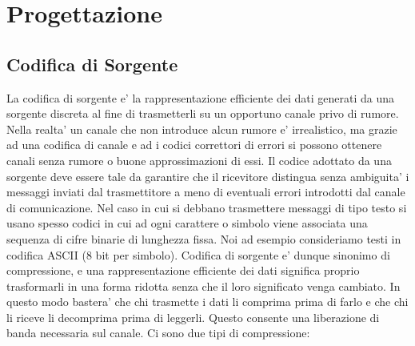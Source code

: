 \documentclass[a4paper,11pt]{article}
\theoremstyle{definition}
\begin{document}
\clearpage

\section{Progettazione}
\subsection{Codifica di Sorgente}
La codifica di sorgente e' la rappresentazione efficiente dei dati generati da una sorgente discreta al fine di trasmetterli su un opportuno canale privo di rumore. Nella realta' un canale che non introduce alcun rumore e' irrealistico, ma grazie ad una codifica di canale e ad i codici correttori di errori si possono ottenere canali senza rumore o buone approssimazioni di essi. 
Il codice adottato da una sorgente deve essere tale da garantire che il ricevitore distingua senza ambiguita' i messaggi inviati dal trasmettitore a meno di eventuali errori introdotti dal canale di comunicazione. Nel caso in cui si debbano trasmettere messaggi di tipo testo si usano spesso codici in cui ad ogni carattere o simbolo viene associata una sequenza di cifre binarie di lunghezza fissa.
Noi ad esempio consideriamo testi in codifica ASCII (8 bit per simbolo). 
\newline \newline
\noindent Codifica di sorgente e' dunque sinonimo di compressione, e una rappresentazione efficiente dei dati significa proprio trasformarli in una forma ridotta senza che il loro significato venga cambiato. In questo modo bastera' che chi trasmette i dati li comprima prima di farlo e che chi li riceve li decomprima
prima di leggerli.
Questo consente una liberazione di banda necessaria sul canale. 
Ci sono due tipi di compressione:
\end{document}
